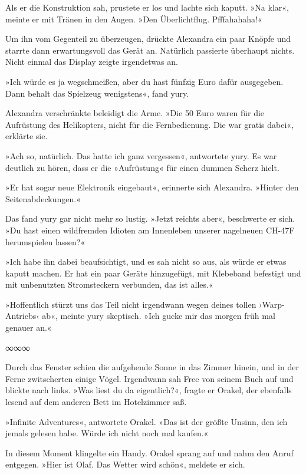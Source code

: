 Als er die Konstruktion sah, prustete er los und lachte sich kaputt. »Na klar«, meinte er mit Tränen in den Augen. »Den Überlichtflug. Pfffahahaha!«

Um ihn vom Gegenteil zu überzeugen, drückte Alexandra ein paar Knöpfe und starrte dann erwartungsvoll das Gerät an. Natürlich passierte überhaupt nichts. Nicht einmal das Display zeigte irgendetwas an.

»Ich würde es ja wegschmeißen, aber du hast fünfzig Euro dafür ausgegeben. Dann behalt das Spielzeug wenigstens«, fand yury.

Alexandra verschränkte beleidigt die Arme. »Die 50 Euro waren für die Aufrüstung des Helikopters, nicht für die Fernbedienung. Die war gratis dabei«, erklärte sie.

»Ach so, natürlich. Das hatte ich ganz vergessen«, antwortete yury. Es war deutlich zu hören, dass er die »Aufrüstung« für einen dummen Scherz hielt.

»Er hat sogar neue Elektronik eingebaut«, erinnerte sich Alexandra. »Hinter den Seitenabdeckungen.«

Das fand yury gar nicht mehr so lustig. »Jetzt reichts aber«, beschwerte er sich. »Du hast einen wildfremden Idioten am Innenleben unserer nagelneuen CH-47F herumspielen lassen?«

»Ich habe ihn dabei beaufsichtigt, und es sah nicht so aus, als würde er etwas kaputt machen. Er hat ein paar Geräte hinzugefügt, mit Klebeband befestigt und mit unbenutzten Stromsteckern verbunden, das ist alles.«

»Hoffentlich stürzt uns das Teil nicht irgendwann wegen deines tollen ›Warp-Antriebs‹ ab«, meinte yury skeptisch. »Ich gucke mir das morgen früh mal genauer an.«

\begin{center}
    ∞∞∞
\end{center}

Durch das Fenster schien die aufgehende Sonne in das Zimmer hinein, und in der Ferne zwitscherten einige Vögel. Irgendwann sah Free von seinem Buch auf und blickte nach links. »Was liest du da eigentlich?«, fragte er Orakel, der ebenfalls lesend auf dem anderen Bett im Hotelzimmer saß.

»Infinite Adventures«, antwortete Orakel. »Das ist der größte Unsinn, den ich jemals gelesen habe. Würde ich nicht noch mal kaufen.«

In diesem Moment klingelte ein Handy. Orakel sprang auf und nahm den Anruf entgegen. »Hier ist Olaf. Das Wetter wird schön«, meldete er sich.

